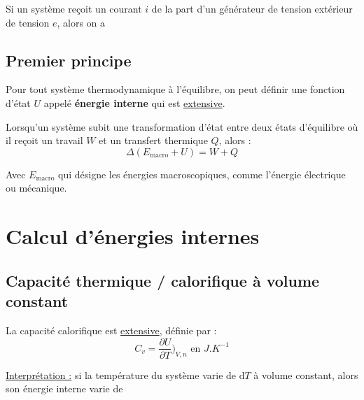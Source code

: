 \documentclass[11pt]{article}
\theoremstyle{cstyle}{\newtheorem{definition}{Définition}[section]}
\theoremstyle{cstyle}{\newtheorem{proposition}[definition]{Propriété}}
\theoremstyle{cstyle}{\newtheorem{theorem}[definition]{Théorème}}
\theoremstyle{mystyle}{\newtheorem{lemma}[definition]{Lemme}}
\theoremstyle{mystyle}{\newtheorem{corollary}[definition]{Corollaire}}
\theoremstyle{mystyle}{\newtheorem*{remark}{Remarque}}
\theoremstyle{mystyle}{\newtheorem*{remarks}{Remarques}}
\theoremstyle{mystyle}{\newtheorem*{example}{Exemple}}
\theoremstyle{mystyle}{\newtheorem*{examples}{Exemples}}
\theoremstyle{definition}{\newtheorem*{exercise}{Exercice}}
\theoremstyle{mystyle}{\newtheorem*{methode}{Méthode}}
\theoremstyle{cstyle}{\newtheorem*{cthm}{}}
\theoremstyle{warn}
\begin{document}
	\newpage
	\begin{minipage}[t]{0.45\textwidth}
		\begin{proposition}
			Si un système reçoit un courant $i$ de la part d'un générateur de tension extérieur de tension $e$, alors on a 
		\end{proposition}
	
		\subsection{Premier principe}
		
		\begin{definition}
			Pour tout système thermodynamique à l'équilibre, on peut définir une fonction d'état \(U\) appelé \textbf{énergie interne} qui est \underline{extensive}. 
		\end{definition}
		
		\begin{theorem}
			Lorsqu'un système subit une transformation d'état entre deux états d'équilibre où il reçoit un travail $W$ et un transfert thermique $Q$, alors :
			\[
				\Delta (E_{\text{macro}} + U) = W + Q
			\]
			
			Avec \(E_\text{macro}\) qui désigne les énergies macroscopiques, comme l'énergie électrique ou mécanique.
		\end{theorem}
	
		\section{Calcul d'énergies internes}
		
		\subsection{Capacité thermique / calorifique à volume constant}
		
		\begin{definition}
			La capacité calorifique est \underline{extensive}, définie par :
			\[
			C_v = \frac{\partial U}{\partial T} \Big)_{V,n} \text{ en } J.K^{-1}
			\]
			
			\underline{Interprétation :} si la température du système varie de \(\text{d}T\) à volume constant, alors son énergie interne varie de 
		\end{definition}
	
		
	\end{minipage}
\end{document}
